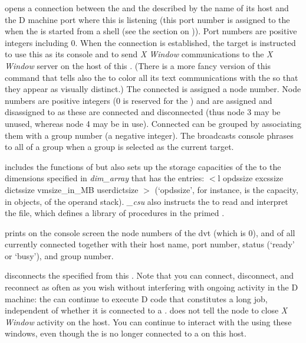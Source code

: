  opens a connection between the  and the
 described by the name of its host and the D machine port
where this  is listening (this port number is assigned to
the  when the  is started from a shell (see
the section on )). Port numbers are positive integers
including $0$. When the connection is established, the target
 is instructed to use this  as its console and
to send \emph{X Window} communications to the \emph{X Window} server
on the host of this . (There is a more fancy version of this
command that tells also the  to color all its text
communications with the  so that they appear as visually
distinct.) The connected  is assigned a node number. Node
numbers are positive integers ($0$ is reserved for the ) and
are assigned and disassigned to  as these are connected
and disconnected (thus node 3 may be unused, whereas node 4 may be in
use). Connected  can be grouped by associating them with
a group number (a negative integer). The  broadcasts console
phrases to all  of a group when a group is selected as
the current target.

 includes the functions of  but also sets up the
storage capacities of the  to the dimensions specified in
\emph{dim\_array} that has the entries: $<$l opdssize excssize
dictssize vmsize\_in\_MB userdictsize $>$ (`opdssize', for instance,
is the capacity, in objects, of the  operand
stack). \emph{\_csu} also instructs the  to read and
interpret the  file, which defines a library of
procedures in the primed .

 prints on the  console screen the node numbers of
the dvt (which is $0$), and of all currently connected 
together with their host name, port number, status (`ready' or
`busy'), and group number.

 disconnects the specified  from this
. Note that you can connect, disconnect, and reconnect
 as often as you wish without interfering with ongoing
activity in the  D machine: the  can
continue to execute D code that constitutes a long job, independent of
whether it is connected to a .  does not tell the
node to close \emph{X Window} activity on the  host. You can
continue to interact with the  using these windows, even
though the  is no longer connected to a  on this
host.

